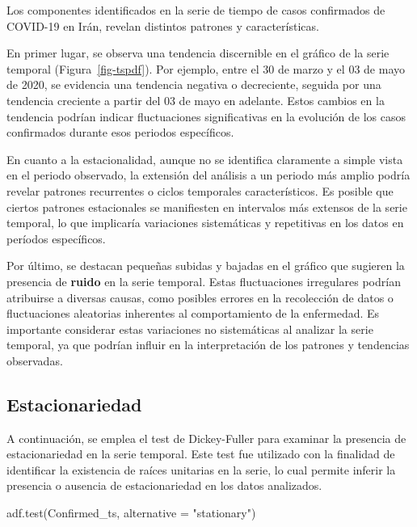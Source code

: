 \documentclass[
  us-letterpaper,
]{scrreprt}
\newenvironment{Shaded}{\begin{snugshade}}{\end{snugshade}}
\newcommand{\AttributeTok}[1]{\textcolor[rgb]{0.40,0.45,0.13}{#1}}
\newcommand{\FunctionTok}[1]{\textcolor[rgb]{0.28,0.35,0.67}{#1}}
\newcommand{\NormalTok}[1]{\textcolor[rgb]{0.00,0.23,0.31}{#1}}
\newcommand{\StringTok}[1]{\textcolor[rgb]{0.13,0.47,0.30}{#1}}
\theoremstyle{plain}
\theoremstyle{definition}
\theoremstyle{definition}
\theoremstyle{plain}
\theoremstyle{remark}
\begin{document}
Los componentes identificados en la serie de tiempo de casos confirmados
de COVID-19 en Irán, revelan distintos patrones y características.

En primer lugar, se observa una tendencia discernible en el gráfico de
la serie temporal (Figura~\ref{fig-tspdf}). Por ejemplo, entre el 30 de
marzo y el 03 de mayo de 2020, se evidencia una tendencia negativa o
decreciente, seguida por una tendencia creciente a partir del 03 de mayo
en adelante. Estos cambios en la tendencia podrían indicar fluctuaciones
significativas en la evolución de los casos confirmados durante esos
periodos específicos.

En cuanto a la estacionalidad, aunque no se identifica claramente a
simple vista en el periodo observado, la extensión del análisis a un
periodo más amplio podría revelar patrones recurrentes o ciclos
temporales característicos. Es posible que ciertos patrones estacionales
se manifiesten en intervalos más extensos de la serie temporal, lo que
implicaría variaciones sistemáticas y repetitivas en los datos en
períodos específicos.

Por último, se destacan pequeñas subidas y bajadas en el gráfico que
sugieren la presencia de \textbf{ruido} en la serie temporal. Estas
fluctuaciones irregulares podrían atribuirse a diversas causas, como
posibles errores en la recolección de datos o fluctuaciones aleatorias
inherentes al comportamiento de la enfermedad. Es importante considerar
estas variaciones no sistemáticas al analizar la serie temporal, ya que
podrían influir en la interpretación de los patrones y tendencias
observadas.

\subsection{Estacionariedad}\label{estacionariedad}

A continuación, se emplea el test de Dickey-Fuller para examinar la
presencia de estacionariedad en la serie temporal. Este test fue
utilizado con la finalidad de identificar la existencia de raíces
unitarias en la serie, lo cual permite inferir la presencia o ausencia
de estacionariedad en los datos analizados.

\begin{Shaded}
\begin{Highlighting}[]
\FunctionTok{adf.test}\NormalTok{(Confirmed\_ts, }\AttributeTok{alternative =} \StringTok{"stationary"}\NormalTok{)}
\end{Highlighting}
\end{Shaded}
\end{document}
